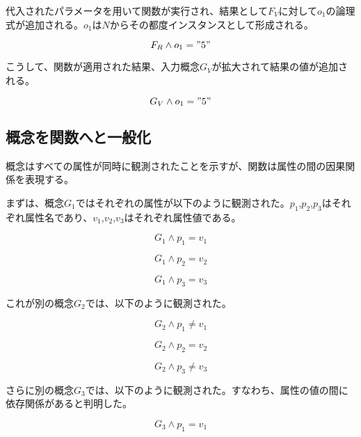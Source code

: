 \documentclass[12pt]{article}
\begin{document}
代入されたパラメータを用いて関数が実行され、結果として\(F_V\)に対して\(o_1\)の論理式が追加される。\(o_1\)は\(N\)からその都度インスタンスとして形成される。

\begin{equation} F_R \wedge o_1 = "5" \end{equation}

こうして、関数が適用された結果、入力概念\(G_V\)が拡大されて結果の値が追加される。

\begin{equation} G_V \wedge o_1 = "5" \end{equation}

\subsection{概念を関数へと一般化}\label{ux6982ux5ff5ux3092ux95a2ux6570ux3078ux3068ux4e00ux822cux5316}

概念はすべての属性が同時に観測されたことを示すが、関数は属性の間の因果関係を表現する。

まずは、概念\(G_1\)ではそれぞれの属性が以下のように観測された。\(p_1\),\(p_2\),\(p_3\)はそれぞれ属性名であり、\(v_1\),\(v_2\),\(v_3\)はそれぞれ属性値である。

\begin{equation}   G_1 \wedge p_1 = v_1\end{equation}

\begin{equation}   G_1 \wedge p_2 = v_2\end{equation}

\begin{equation}   G_1 \wedge p_3 = v_3\end{equation}

これが別の概念\(G_2\)では、以下のように観測された。

\begin{equation}   G_2 \wedge p_1 \neq v_1\end{equation}

\begin{equation}   G_2 \wedge p_2 = v_2\end{equation}

\begin{equation}   G_2 \wedge p_3 \neq v_3\end{equation}

さらに別の概念\(G_3\)では、以下のように観測された。すなわち、属性の値の間に依存関係があると判明した。

\begin{equation}   G_3 \wedge p_1 = v_1\end{equation}
\end{document}

